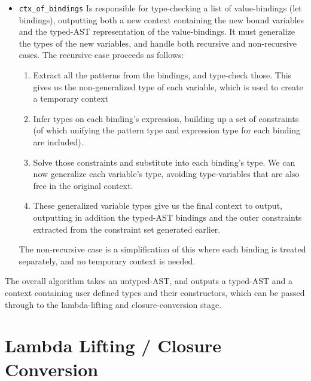\documentclass[12pt,twoside,notitlepage]{report}
\newcommand{\camlinline}{\texttt}
\newcommand\note[1]{\textcolor{blue}{#1}}
\begin{document}
\begin{itemize}
	\item \camlinline{ctx_of_bindings} Is responsible for type-checking a list of value-bindings (let bindings), outputting both a new context containing the new bound variables and the typed-AST representation of the value-bindings. It must generalize the types of the new variables, and handle both recursive and non-recursive cases. The recursive case proceeds as follows:
	\begin{enumerate}
		\item Extract all the patterns from the bindings, and type-check those. This gives us the non-generalized type of each variable, which is used to create a temporary context
		\item Infer types on each binding's expression, building up a set of constraints (of which unifying the pattern type and expression type for each binding are included).
		\item Solve those constraints and substitute into each binding's type. We can now generalize each variable's type, avoiding type-variables that are also free in the original context.
		\item These generalized variable types give us the final context to output, outputting in addition the typed-AST bindings and the outer constraints extracted from the constraint set generated earlier.
	\end{enumerate}
	The non-recursive case is a simplification of this where each binding is treated separately, and no temporary context is needed.
\end{itemize}

The overall algorithm takes an untyped-AST, and outputs a typed-AST and a context containing user defined types and their constructors, which can be passed through to the lambda-lifting and closure-conversion stage.

\section{Lambda Lifting / Closure Conversion}
\end{document}

